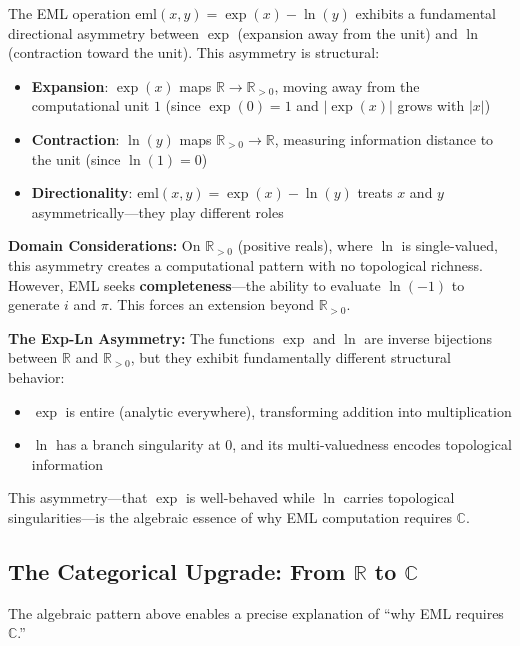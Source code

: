 \documentclass[11pt]{article}
\providecommand{\tightlist}{%
  \setlength{\itemsep}{0pt}\setlength{\parskip}{0pt}}
\begin{document}
The EML operation \(\mathrm{eml}(x, y) = \exp(x) - \ln(y)\) exhibits a fundamental directional asymmetry between \(\exp\) (expansion away from the unit) and \(\ln\) (contraction toward the unit). This asymmetry is structural:

\begin{itemize}
\tightlist
\item
  \textbf{Expansion}: \(\exp(x)\) maps \(\mathbb{R} \to \mathbb{R}_{>0}\), moving away from the computational unit \(1\) (since \(\exp(0) = 1\) and \(|\exp(x)|\) grows with \(|x|\))
\item
  \textbf{Contraction}: \(\ln(y)\) maps \(\mathbb{R}_{>0} \to \mathbb{R}\), measuring information distance to the unit (since \(\ln(1) = 0\))
\item
  \textbf{Directionality}: $\mathrm{eml}(x,y) = \exp(x) - \ln(y)$ treats $x$ and $y$ asymmetrically---they play different roles
\end{itemize}

\textbf{Domain Considerations:} On \(\mathbb{R}_{>0}\) (positive reals), where \(\ln\) is single-valued, this asymmetry creates a computational pattern with no topological richness. However, EML seeks \textbf{completeness}---the ability to evaluate \(\ln(-1)\) to generate \(i\) and \(\pi\). This forces an extension beyond \(\mathbb{R}_{>0}\).

\textbf{The Exp-Ln Asymmetry:} The functions \(\exp\) and \(\ln\) are inverse bijections between \(\mathbb{R}\) and \(\mathbb{R}_{>0}\), but they exhibit fundamentally different structural behavior:
\begin{itemize}
\tightlist
\item
  \(\exp\) is entire (analytic everywhere), transforming addition into multiplication
\item
  \(\ln\) has a branch singularity at 0, and its multi-valuedness encodes topological information
\end{itemize}
This asymmetry---that \(\exp\) is well-behaved while \(\ln\) carries topological singularities---is the algebraic essence of why EML computation requires \(\mathbb{C}\).
\subsection{The Categorical Upgrade: From \(\mathbb{R}\) to \(\mathbb{C}\)}
\label{sec:categorical-upgrade}

The algebraic pattern above enables a precise explanation of ``why EML requires \(\mathbb{C}\).''
\end{document}

